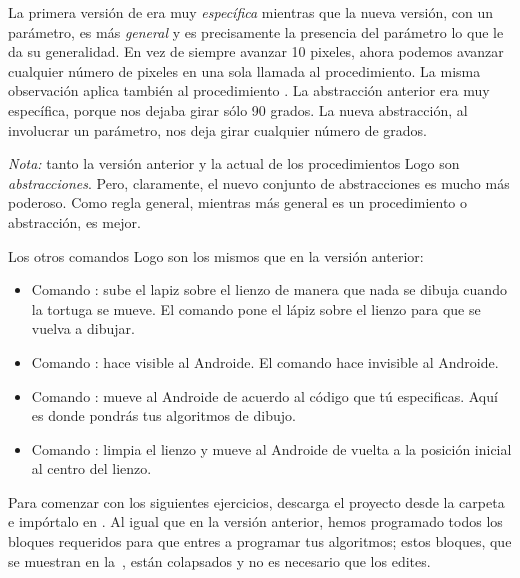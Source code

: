 La primera versión de  era muy \emph{específica}
mientras que la nueva versión, con un parámetro, es más \emph{general}
y es precisamente la presencia del parámetro lo que le da su
generalidad. En vez de siempre avanzar 10 pixeles, ahora podemos
avanzar cualquier número de pixeles en una sola llamada al
procedimiento. La misma observación aplica también al procedimiento
. La abstracción anterior era muy específica,
porque nos dejaba girar sólo 90 grados. La nueva abstracción, al
involucrar un parámetro, nos deja girar cualquier número de grados.

\emph{Nota:} tanto la versión anterior y la actual de los
procedimientos Logo son \emph{abstracciones}. Pero, claramente, el
nuevo conjunto de abstracciones es mucho más poderoso. Como regla
general, mientras más general es un procedimiento o abstracción, es
mejor.

Los otros comandos Logo son los mismos que en la versión anterior:

\begin{itemize}

\item Comando : sube el lapiz sobre el lienzo
  de manera que nada se dibuja cuando la tortuga se mueve. El comando
   pone el lápiz sobre el lienzo para que se
  vuelva a dibujar.

\item Comando : hace visible al
  Androide. El comando  hace invisible al
  Androide.

\item Comando : mueve al Androide de acuerdo al
  código que tú especificas. Aquí es donde pondrás tus algoritmos de
  dibujo.

\item Comando : limpia el lienzo y mueve al
  Androide de vuelta a la posición inicial al centro del lienzo.

\end{itemize}

Para comenzar con los siguientes ejercicios, descarga el proyecto
 desde la carpeta  e
impórtalo en \AppInventor. Al igual que en la versión anterior, hemos
programado todos los bloques requeridos para que entres a programar
tus algoritmos; estos bloques, que se muestran en la~,
están colapsados y no es necesario que
los edites.

